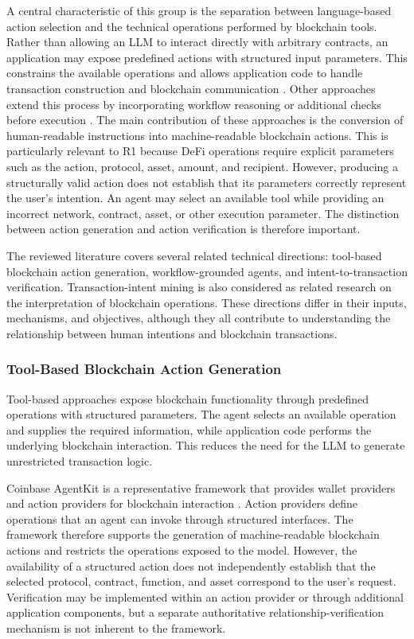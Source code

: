 A central characteristic of this group is the separation
between language-based action selection and the technical
operations performed by blockchain tools. Rather than allowing
an LLM to interact directly with arbitrary contracts, an
application may expose predefined actions with structured
input parameters. This constrains the available operations
and allows application code to handle transaction construction
and blockchain communication
\cite{coinbaseAgentKit2026}. Other approaches extend this
process by incorporating workflow reasoning or additional
checks before execution
\cite{TODO_Web3Agent,TODO_Arbiter2026}. The main contribution of these approaches is the conversion
of human-readable instructions into machine-readable blockchain
actions. This is particularly relevant to R1 because DeFi
operations require explicit parameters such as the action,
protocol, asset, amount, and recipient. However, producing
a structurally valid action does not establish that its
parameters correctly represent the user's intention.
An agent may select an available tool while providing an
incorrect network, contract, asset, or other execution
parameter. The distinction between action generation and
action verification is therefore important.

The reviewed literature covers several related technical
directions: tool-based blockchain action generation,
workflow-grounded agents, and intent-to-transaction
verification. Transaction-intent mining is also considered
as related research on the interpretation of blockchain
operations. These directions differ in their inputs,
mechanisms, and objectives, although they all contribute
to understanding the relationship between human intentions
and blockchain transactions.

\subsubsection{Tool-Based Blockchain Action Generation}

Tool-based approaches expose blockchain functionality through
predefined operations with structured parameters. The agent
selects an available operation and supplies the required
information, while application code performs the underlying
blockchain interaction. This reduces the need for the LLM
to generate unrestricted transaction logic. 

Coinbase AgentKit is a representative framework that provides
wallet providers and action providers for blockchain
interaction \cite{coinbaseAgentKit2026}. Action providers
define operations that an agent can invoke through structured
interfaces. The framework therefore supports the generation
of machine-readable blockchain actions and restricts the
operations exposed to the model. However, the availability of a structured action does not
independently establish that the selected protocol, contract,
function, and asset correspond to the user's request.
Verification may be implemented within an action provider
or through additional application components, but a
separate authoritative relationship-verification mechanism
is not inherent to the framework.

